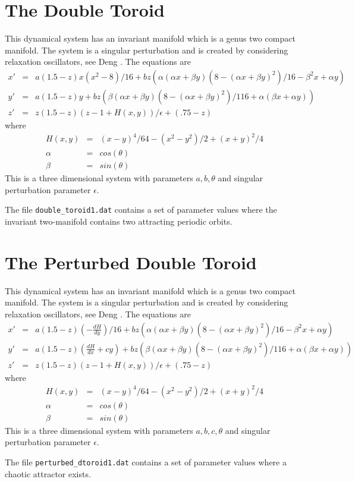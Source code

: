 \section{The Double Toroid}

This dynamical system has an invariant manifold which is a genus
two compact manifold.  The system is a singular perturbation and is created
by considering relaxation oscillators, see Deng \cite{Deng:constructing}.
The equations are
\begin{eqnarray*}
x' & = & a(1.5-z)x(x^2-8)/16+b z(\alpha (\alpha x + \beta y) (8-(\alpha x + \beta y)^2) /16
	- \beta^2 x + \alpha y) \\
y' & = & a(1.5-z)y+b z(\beta (\alpha x + \beta y )(8-(\alpha x + \beta y)^2)/116 + \alpha
	(\beta x + \alpha y)) \\
z' & = & z(1.5-z)(z-1+H(x,y))/\epsilon+(.75-z)
\end{eqnarray*}
where
\begin{eqnarray*}
H(x,y) & = & (x-y)^4/64 -(x^2-y^2)/2+(x+y)^2/4 \\
\alpha & = & cos(\theta) \\
\beta & = & sin(\theta)
\end{eqnarray*}
This is a three dimensional system with parameters $a,b,\theta$ and
singular perturbation parameter $\epsilon$.

The file {\tt double\_toroid1.dat} contains a set of parameter values where
the invariant two-manifold contains two attracting periodic orbits.



\section{The Perturbed Double Toroid}

This dynamical system has an invariant manifold which is a genus
two compact manifold.  The system is a singular perturbation and is created
by considering relaxation oscillators, see Deng \cite{Deng:constructing}.
The equations are
\begin{eqnarray*}
x' & = & a(1.5-z)(-\frac{dH}{dy})/16+b z(\alpha (\alpha x + \beta y) (8-(\alpha x + \beta y)^2) /16
	- \beta^2 x + \alpha y) \\
y' & = & a(1.5-z)(\frac{dH}{dx}+cy)+b z(\beta (\alpha x + \beta y )(8-(\alpha x + \beta y)^2)/116 + \alpha
	(\beta x + \alpha y)) \\
z' & = & z(1.5-z)(z-1+H(x,y))/\epsilon+(.75-z)
\end{eqnarray*}
where
\begin{eqnarray*}
H(x,y) & = & (x-y)^4/64 -(x^2-y^2)/2+(x+y)^2/4 \\
\alpha & = & cos(\theta) \\
\beta & = & sin(\theta)
\end{eqnarray*}
This is a three dimensional system with parameters $a,b,c,\theta$ and
singular perturbation parameter $\epsilon$.

The file {\tt perturbed\_dtoroid1.dat} contains a set of parameter values where
a chaotic attractor exists.
